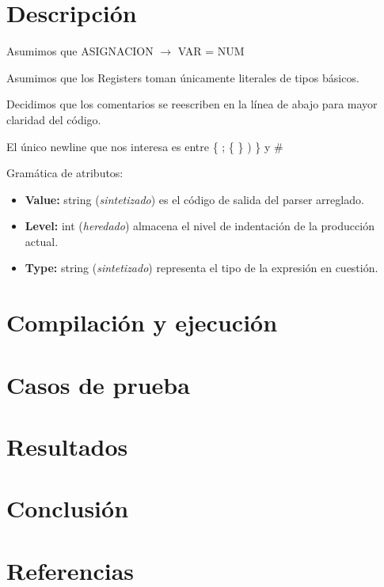 \documentclass[10pt,a4paper]{article}
\begin{document}
\section{Descripción}

Asumimos que ASIGNACION $\rightarrow$ VAR = NUM 

Asumimos que los Registers toman únicamente literales de tipos básicos.

Decidimos que los comentarios se reescriben en la línea de abajo para mayor claridad del código.

El único newline que nos interesa es entre \{ ; \{ \} ) \} y \#

Gramática de atributos:

\begin{itemize}
\item \textbf{Value:} string (\textit{sintetizado}) es el código de salida del parser arreglado.
\item \textbf{Level:} int (\textit{heredado}) almacena el nivel de indentación de la producción actual.
\item \textbf{Type:} string (\textit{sintetizado}) representa el tipo de la expresión en cuestión.
\end{itemize}

\section{Compilación y ejecución}

\section{Casos de prueba}

\section{Resultados}

\section{Conclusión}

\section{Referencias}
\end{document}
